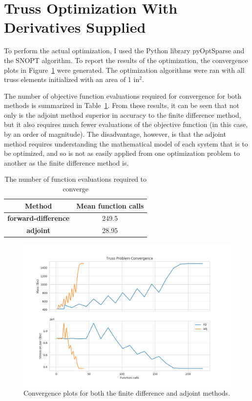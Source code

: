 \documentclass{article}
\begin{document}
\section{Truss Optimization With Derivatives Supplied}

To perform the actual optimization, I used the Python library pyOptSparse and the SNOPT algorithm. To report the results of the optimization, the convergence plots in Figure~\ref{fig:converge} were generated. The optimization algorithms were ran with all truss elements initialized with an area of 1 in$^2$. 

The number of objective function evaluations required for convergence for both methods is summarized in Table~\ref{tab:evals}. From these results, it can be seen that not only is the adjoint method superior in accuracy to the finite difference method, but it also requires much fewer evaluations of the objective function (in this case, by an order of magnitude). The disadvantage, however, is that the adjoint method requires understanding the mathematical model of each system that is to be optimized, and so is not as easily applied from one optimization problem to another as the finite difference method is.

\begin{table}[htb]
	\centering
	\caption{The number of function evaluations required to converge}\label{tab:evals}
	\begin{tabular}{c c}
		\toprule
		\textbf{Method} & Mean function calls \\
		\midrule
		\textbf{forward-difference} & 249.5 \\
		\textbf{adjoint} & 28.95 \\ 
		\bottomrule
	\end{tabular}
\end{table}

\begin{figure}[htb]
	\centering
	\includegraphics[width=\textwidth]{figures/convergence.png}
	\caption{Convergence plots for both the finite difference and adjoint methods.\label{fig:converge}}
\end{figure}


\end{document}
